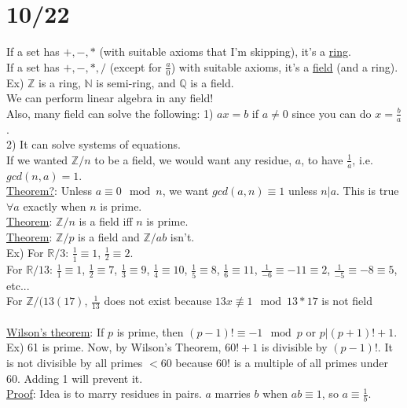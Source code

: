 \documentclass[13pt]{article}
\begin{document}
\section*{10/22}
	If a set has $+, -, *$ (with suitable axioms that I'm skipping),
	it's a \underline{ring}.\\
	If a set has $+, -, *, /$ (except for $\frac{a}{0}$) with suitable
	axioms, it's a \underline{field} (and a ring).\\
	Ex) $\mathbb{Z}$ is a ring, $\mathbb{N}$ is semi-ring, and $\mathbb{Q}$
	is a field.\\
	We can perform linear algebra in any field!\\
	Also, many field can solve the following:
	1) $ax = b$ if $a \not= 0$ since you can do $x = \frac{b}{a}$.\\
	2) It can solve systems of equations.\\
	If we wanted $\mathbb{Z}/n$ to be a field, we would want any residue,
	$a$, to have $\frac{1}{a}$, i.e. $gcd(n, a) = 1$.\\
	\underline{Theorem?}: Unless $a \equiv 0 \mod n$, we want $gcd(a, n) 
	\equiv 1$ unless $n | a$. This is true $\forall a$ exactly when $n$ is 
	prime.\\
	\underline{Theorem}: $\mathbb{Z}/n$ is a field iff $n$ is prime.\\
	\underline{Theorem}: $\mathbb{Z}/p$ is a field and $\mathbb{Z}/ab$ isn't.\\
	Ex) For $\mathbb{R}/3$: $\frac{1}{\bar{1}} \equiv 1$, $\frac{1}{2} \equiv 
	2$.\\
	For $\mathbb{R}/13$: $\frac{1}{1} \equiv 1$, $\frac{1}{2} \equiv 7$, 
	$\frac{1}{3} \equiv 9$, $\frac{1}{4} \equiv 10$, $\frac{1}{5} \equiv 8$,
	$\frac{1}{6} \equiv 11$, $\frac{1}{-6} \equiv -11 \equiv 2$, $\frac{1}{-5}
	\equiv -8 \equiv 5$, etc...\\
	For $\mathbb{Z}/(13(17)$, $\frac{1}{13}$ does not exist because $13x
	\not\equiv 1 \mod 13*17$ is not field\\\\
	\underline{Wilson's theorem}: If $p$ is prime, then $(p-1)! \equiv -1 \mod
	p$ or $p | (p+1)! + 1$.\\
	Ex) 61 is prime. Now, by Wilson's Theorem, $60! + 1$ is divisible by 
	$(p-1)!$. It is not divisible by all primes $< 60$ because $60!$ is a
	multiple of all primes under $60$. Adding 1 will prevent it.\\
	\underline{Proof}: Idea is to marry residues in pairs. $a$ marries $b$ when
	$ab \equiv 1$, so $ a \equiv \frac{1}{b}$.\\
\end{document}
